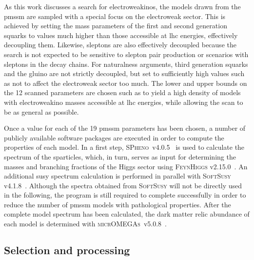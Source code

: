 \begin{table}
	\label{fig:pmssm_scan_ranges}   
\end{table}


As this work discusses a search for electroweakinos, the models drawn from the \gls{pmssm} are sampled with a special focus on the electroweak sector.
This is achieved by setting the mass parameters of the first and second generation squarks to values much higher than those accessible at \gls{lhc} energies, effectively decoupling them. Likewise, sleptons are also effectively decoupled because the \onelepton search is not expected to be sensitive to slepton pair production or scenarios with sleptons in the decay chains. 
For naturalness arguments, third generation squarks and the gluino are not strictly decoupled, but set to sufficiently high values such as not to affect the electroweak sector too much. 
The lower and upper bounds on the 12 scanned parameters are chosen such as to yield a high density of models with electroweakino masses accessible at \gls{lhc} energies, while allowing the scan to be as general as possible. 

Once a value for each of the 19 \gls{pmssm} parameters has been chosen, a number of publicly available software packages are executed in order to compute the properties of each model.
In a first step, \textsc{SPheno}~v4.0.5~\cite{spheno_1:2003um,spheno_2:2011nf} is used to calculate the spectrum of the sparticles, which, in turn, serves as input for determining the masses and branching fractions of the Higgs sector using \textsc{FeynHiggs} v2.15.0~\cite{FeynHiggs:1998yj,FeynHiggs_1:2018qog,FeynHiggs_2:2013ria}.
An additional \gls{susy} spectrum calculation is performed in parallel with \textsc{SoftSusy} v4.1.8~\cite{softsusy:2001kg}.
Although the spectra obtained from \textsc{SoftSusy} will not be directly used in the following, the program is still required to complete successfully in order to reduce the number of \gls{pmssm} models with pathological properties.
After the complete model spectrum has been calculated, the dark matter relic abundance of each model is determined with \textsc{micrOMEGAs}~v5.0.8~\cite{micromegas_1:2006is,micromegas_2:2010pz}.


\subsection{Selection and processing}


